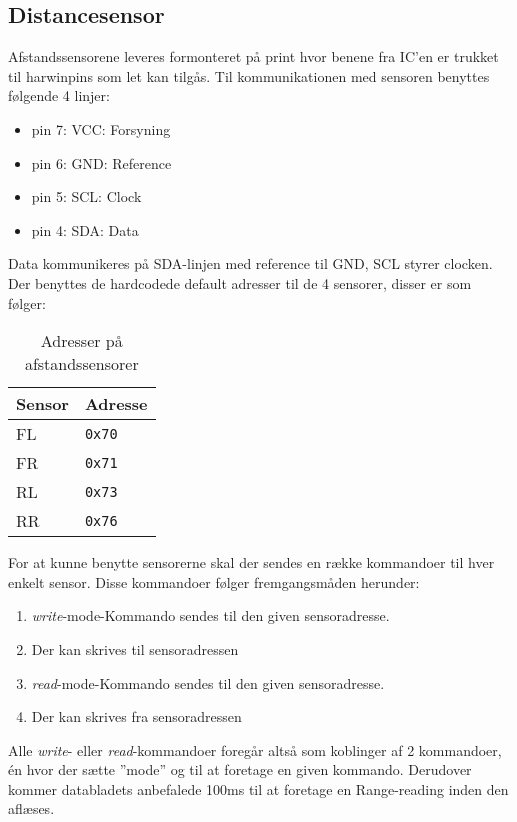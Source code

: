\subsection{Distancesensor}

Afstandssensorene leveres formonteret på print hvor benene fra IC'en er trukket til harwinpins som let kan tilgås. Til kommunikationen med sensoren benyttes følgende 4 linjer: 

\begin{itemize}
	\item pin 7: VCC: Forsyning
	\item pin 6: GND: Reference
	\item pin 5: SCL: Clock
	\item pin 4: SDA: Data
\end{itemize}

Data kommunikeres på SDA-linjen med reference til GND,  SCL styrer clocken.
Der benyttes de hardcodede default adresser til de 4 sensorer, disser er som følger: 

\begin{table}[h]\centering
	\begin{tabular}{| l | l |} \hline
		\textbf{Sensor} 	& \textbf{Adresse}  \\\hline
		FL 					& \texttt{0x70} 	\\\hline
		FR 					& \texttt{0x71} 	\\\hline
		RL 					& \texttt{0x73} 	\\\hline
		RR 					& \texttt{0x76} 	\\\hline
	\end{tabular}
	\caption{Adresser på afstandssensorer}
	\label{table:adr_afstandssensorer}
\end{table}

For at kunne benytte sensorerne skal der sendes en række kommandoer til hver enkelt sensor. Disse kommandoer følger fremgangsmåden herunder:

\begin{enumerate}
  \item \textit{write}-mode-Kommando sendes til den given sensoradresse.
  \item Der kan skrives til sensoradressen
  \item \textit{read}-mode-Kommando sendes til den given sensoradresse.
  \item Der kan skrives fra sensoradressen
\end{enumerate}

Alle \textit{write}- eller \textit{read}-kommandoer foregår altså som koblinger af 2 kommandoer, én hvor der sætte ''mode'' og til at foretage en given kommando. Derudover kommer databladets anbefalede 100ms til at foretage en Range-reading inden den aflæses.

